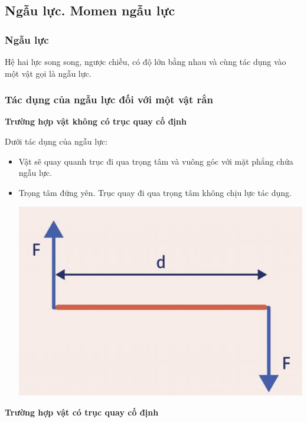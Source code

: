 \subsection{Ngẫu lực. Momen ngẫu lực}
\vspace{-0.5cm}
\subsubsection{Ngẫu lực}
Hệ hai lực song song, ngược chiều, có độ lớn bằng nhau và cùng tác dụng vào một vật gọi là ngẫu lực.
\subsubsection{Tác dụng của ngẫu lực đối với một vật rắn}
\textbf{Trường hợp vật không có trục quay cố định}

Dưới tác dụng của ngẫu lực:
\begin{itemize}
	\item  Vật sẽ quay quanh trục đi qua trọng tâm và vuông góc với mặt phẳng chứa ngẫu lực.
	\item Trọng tâm đứng yên. Trục quay đi qua trọng tâm không chịu lực tác dụng.
	\begin{center}
		\includegraphics[scale=0.4]{../figs/VN10-PH-25-L-020-1-V2-01.JPG}
	\end{center}	
\end{itemize}
\textbf{Trường hợp vật có trục quay cố định}

